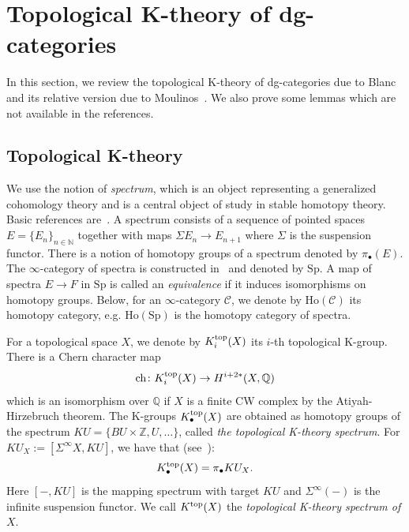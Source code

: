 \documentclass [11pt,oneside,a4paper,mathscr]{amsart}
\theoremstyle{definition}
\newcommand{\ch}{\operatorname{ch}}
\begin{document}
\section{Topological K-theory of dg-categories}\label{sec:topK:dg}
In this section, we review the topological K-theory 
of dg-categories due to Blanc~\cite{Blanc}
and its relative version due to Moulinos~\cite{Moulinos}. 
We also prove some lemmas which are not available 
in the references. 
\subsection{Topological K-theory}\label{subsec:topK:review}
We use the notion of \textit{spectrum}, which is an object 
representing a generalized cohomology theory and is a central object of study in stable homotopy theory. 
Basic references are~\cite{Adams2, May}. 
A spectrum consists of a sequence of pointed spaces $E=\{E_n\}_{n\in \mathbb{N}}$ 
together with maps $\Sigma E_n \to E_{n+1}$ where $\Sigma$ is the suspension 
functor. 
There is a notion of homotopy groups of a spectrum 
denoted by $\pi_{\bullet}(E)$.
The $\infty$-category of spectra is 
constructed in~\cite[Section~1.4]{LHAG} and 
denoted by $\mathrm{Sp}$.
A map of spectra 
$E \to F$ 
in $\mathrm{Sp}$
is called an \textit{equivalence} if it induces
isomorphisms on homotopy groups. Below, for an $\infty$-category $\mathcal{C}$, we 
denote by $\mathrm{Ho}(\mathcal{C})$ its homotopy category, e.g. $\mathrm{Ho}(\mathrm{Sp})$ is the 
homotopy category of spectra. 


For a topological space $X$, we denote by $K^{\rm{top}}_{i}(X)$ its $i$-th
topological K-group.
There is a Chern character map 
\begin{align}\label{ch:Ktheory}
\ch \colon 
    K^{\rm{top}}_i(X) \to H^{i+2\ast}(X, \mathbb{Q})
\end{align}
which is an isomorphism over $\mathbb{Q}$ 
if $X$ is a finite CW complex
by the Atiyah-Hirzebruch theorem. 
The K-groups $K^{\rm{top}}_{\bullet}(X)$ 
are obtained as homotopy groups of the spectrum $KU=\{BU\times \mathbb{Z}, U, \ldots\}$, 
called \textit{the topological K-theory spectrum}. 
For $KU_X:=[\Sigma^{\infty}X, KU]$, we have that (see~\cite[Sections~22-24]{May}):
\begin{align*}
	K_{\bullet}^{\rm{top}}(X)=\pi_{\bullet}KU_X. 
\end{align*}
Here $[-, KU]$ is the mapping spectrum with target $KU$
and $\Sigma^{\infty}(-)$ is the infinite suspension functor. 
We call $K^{\rm{top}}(X)$ the \textit{topological K-theory spectrum of }$X$. 
\end{document}
